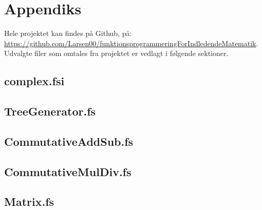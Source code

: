 \section{Appendiks}
Hele projektet kan findes på Github, på:\\ \url{https://github.com/Larsen00/funktionsprogrammeringForIndledendeMatematik}. Udvalgte filer som omtales fra projektet er vedlagt i følgende sektioner.
\subsection{complex.fsi} \label{sec:complex.fsi}



\subsection{TreeGenerator.fs} \label{sec:treeGenerator.fs}


\subsection{CommutativeAddSub.fs} \label{sec:commutativeAddSub.fs}


\subsection{CommutativeMulDiv.fs} \label{sec:commutativeMulDiv.fs}


\subsection{Matrix.fs} \label{sec:matrix.fs}
